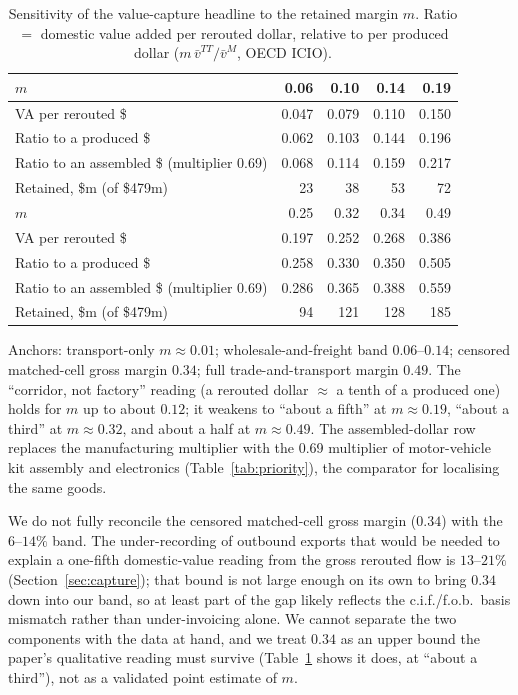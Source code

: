 \documentclass[12pt]{article}
\begin{document}
\begin{table}[htbp]
\centering
\caption{Sensitivity of the value-capture headline to the retained margin $m$.
Ratio $=$ domestic value added per rerouted dollar, relative to per produced dollar
($m\,\bar v^{TT}/\bar v^{M}$, OECD ICIO).}
\label{tab:appd}
\footnotesize
\begin{tabular}{@{}lrrrr@{}}
\toprule
$m$ & 0.06 & 0.10 & 0.14 & 0.19 \\
\midrule
VA per rerouted \$ & 0.047 & 0.079 & 0.110 & 0.150 \\
Ratio to a produced \$ & 0.062 & 0.103 & 0.144 & 0.196 \\
Ratio to an assembled \$ (multiplier 0.69) & 0.068 & 0.114 & 0.159 & 0.217 \\
Retained, \$m (of \$479m) & 23 & 38 & 53 & 72 \\
\midrule
$m$ & 0.25 & 0.32 & 0.34 & 0.49 \\
\midrule
VA per rerouted \$ & 0.197 & 0.252 & 0.268 & 0.386 \\
Ratio to a produced \$ & 0.258 & 0.330 & 0.350 & 0.505 \\
Ratio to an assembled \$ (multiplier 0.69) & 0.286 & 0.365 & 0.388 & 0.559 \\
Retained, \$m (of \$479m) & 94 & 121 & 128 & 185 \\
\bottomrule
\end{tabular}

\vspace{2pt}
\footnotesize Anchors: transport-only $m\approx 0.01$; wholesale-and-freight band
$0.06$--$0.14$; censored matched-cell gross margin $0.34$; full trade-and-transport margin
$0.49$. The ``corridor, not factory'' reading (a rerouted dollar $\approx$ a tenth of a
produced one) holds for $m$ up to about $0.12$; it weakens to ``about a fifth'' at $m\approx
0.19$, ``about a third'' at $m\approx 0.32$, and about a half at $m\approx 0.49$. The assembled-dollar row replaces the manufacturing multiplier with the 0.69 multiplier of motor-vehicle kit assembly and electronics (Table~\ref{tab:priority}), the comparator for localising the same goods.
\end{table}

We do not fully reconcile the censored matched-cell gross margin ($0.34$) with the $6$--$14\%$
band. The under-recording of outbound exports that would be needed to explain a one-fifth
domestic-value reading from the gross rerouted flow is $13$--$21\%$ (Section~\ref{sec:capture});
that bound is not large enough on its own to bring $0.34$ down into our band, so at least part
of the gap likely reflects the c.i.f./f.o.b.\ basis mismatch rather than under-invoicing alone.
We cannot separate the two components with the data at hand, and we treat $0.34$ as an upper
bound the paper's qualitative reading must survive (Table~\ref{tab:appd} shows it does, at
``about a third''), not as a validated point estimate of $m$.
\end{document}
